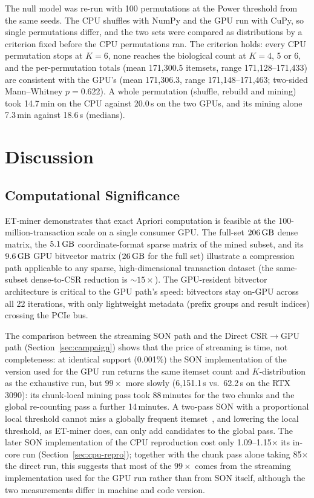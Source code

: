 \documentclass[10pt,a4paper,twocolumn]{article}
\begin{document}
The null model was re-run with 100 permutations at the Power threshold from the same seeds. The CPU shuffles with NumPy and the GPU run with CuPy, so single permutations differ, and the two sets were compared as distributions by a criterion fixed before the CPU permutations ran. The criterion holds: every CPU permutation stops at $K{=}6$, none reaches the biological count at $K{=}4$, 5 or 6, and the per-permutation totals (mean 171,300.5 itemsets, range 171,128--171,433) are consistent with the GPU's (mean 171,306.3, range 171,148--171,463; two-sided Mann--Whitney $p{=}0.622$). A whole permutation (shuffle, rebuild and mining) took 14.7\,min on the CPU against 20.0\,s on the two GPUs, and its mining alone 7.3\,min against 18.6\,s (medians).

\section{Discussion}
\label{sec:discussion}

\subsection{Computational Significance}

ET-miner demonstrates that exact Apriori computation is feasible at the 100-million-transaction scale on a single consumer GPU. The full-set $206\text{\,GB}$ dense matrix, the $5.1\text{\,GB}$ coordinate-format sparse matrix of the mined subset, and its $9.6\text{\,GB}$ GPU bitvector matrix ($26\text{\,GB}$ for the full set) illustrate a compression path applicable to any sparse, high-dimensional transaction dataset (the same-subset dense-to-CSR reduction is ${\sim}15\times$). The GPU-resident bitvector architecture is critical to the GPU path's speed: bitvectors stay on-GPU across all 22 iterations, with only lightweight metadata (prefix groups and result indices) crossing the PCIe bus.

The comparison between the streaming SON path and the Direct CSR$\to$GPU path (Section~\ref{sec:campaign}) shows that the price of streaming is time, not completeness: at identical support (0.001\%) the SON implementation of the version used for the GPU run returns the same itemset count and $K$-distribution as the exhaustive run, but $99\times$ more slowly (6,151.1\,s vs.\ 62.2\,s on the RTX 3090): its chunk-local mining pass took 88\,minutes for the two chunks and the global re-counting pass a further 14\,minutes. A two-pass SON with a proportional local threshold cannot miss a globally frequent itemset~\cite{savasere1995}, and lowering the local threshold, as ET-miner does, can only add candidates to the global pass. The later SON implementation of the CPU reproduction cost only 1.09--1.15$\times$ its in-core run (Section~\ref{sec:cpu-repro}); together with the chunk pass alone taking 85$\times$ the direct run, this suggests that most of the $99\times$ comes from the streaming implementation used for the GPU run rather than from SON itself, although the two measurements differ in machine and code version.
\end{document}
